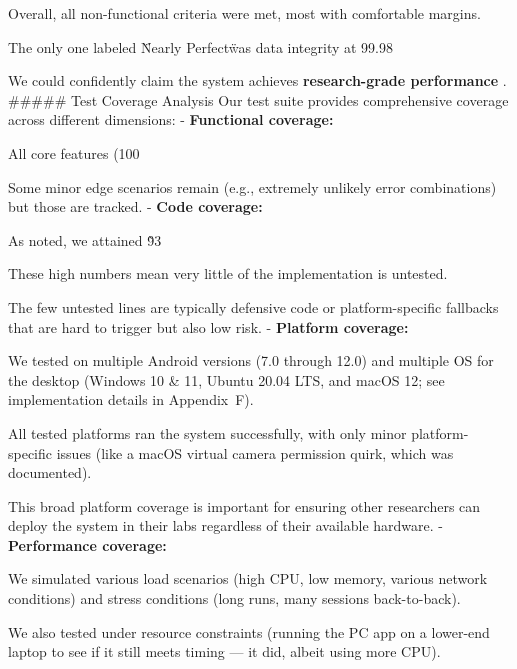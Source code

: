 {{{{{{{{{{{{{{{{Overall, all non-functional criteria were met, most with comfortable margins.

The only one labeled \"Nearly Perfect\" was data integrity at 99.98%

We could confidently claim the system achieves \textbf{research-grade performance}
. ##### Test Coverage Analysis Our test suite provides comprehensive coverage across different dimensions: - \textbf{Functional coverage:}

All core features (100%

Some minor edge scenarios remain (e.g., extremely unlikely error combinations) but those are tracked. - \textbf{Code coverage:}

As noted, we attained \~93%

These high numbers mean very little of the implementation is untested.

The few untested lines are typically defensive code or platform-specific fallbacks that are hard to trigger but also low risk. - \textbf{Platform coverage:}

We tested on multiple Android versions (7.0 through 12.0) and multiple OS for the desktop (Windows 10 \& 11, Ubuntu 20.04 LTS, and macOS 12; see implementation details in Appendix~F).

All tested platforms ran the system successfully, with only minor platform-specific issues (like a macOS virtual camera permission quirk, which was documented).

This broad platform coverage is important for ensuring other researchers can deploy the system in their labs regardless of their available hardware. - \textbf{Performance coverage:}

We simulated various load scenarios (high CPU, low memory, various network conditions) and stress conditions (long runs, many sessions back-to-back).

We also tested under resource constraints (running the PC app on a lower-end laptop to see if it still meets timing --- it did, albeit using more CPU).

}}}}}}}}}}}}}}}}
